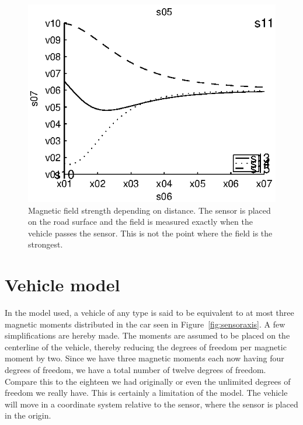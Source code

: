 \begin{figure}[htbf]
 \centering
 \begin{minipage}{0.6\linewidth}
 
 \includegraphics[width=1\linewidth]{images/distance}
 \caption[Simulated magnetic field strength depending on distance]{Magnetic field strength depending on distance. The sensor is placed on the road surface and the field is measured exactly when the vehicle passes the sensor. This is not the point where the field is the strongest.}
 \label{fig:distance}
 \end{minipage}
\end{figure}

\section{Vehicle model}
In the model used, a vehicle of any type is said to be equivalent to at most three magnetic moments distributed in the car seen in \mbox{Figure \ref{fig:sensoraxis}}. A few simplifications are hereby made. The moments are assumed to be placed on the centerline of the vehicle, thereby reducing the degrees of freedom per magnetic moment by two. Since we have three magnetic moments each now having four degrees of freedom, we have a total number of twelve degrees of freedom. Compare this to the eighteen we had originally or even the unlimited degrees of freedom we really have. This is certainly a limitation of the model. The vehicle will move in a coordinate system relative to the sensor, where the sensor is placed in the origin.

